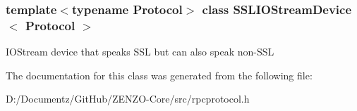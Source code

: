 \subsubsection*{template$<$typename Protocol$>$\newline
class S\+S\+L\+I\+O\+Stream\+Device$<$ Protocol $>$}

I\+O\+Stream device that speaks S\+SL but can also speak non-\/\+S\+SL 

The documentation for this class was generated from the following file\+:\begin{DoxyCompactItemize}
\item 
D\+:/\+Documentz/\+Git\+Hub/\+Z\+E\+N\+Z\+O-\/\+Core/src/rpcprotocol.\+h\end{DoxyCompactItemize}
